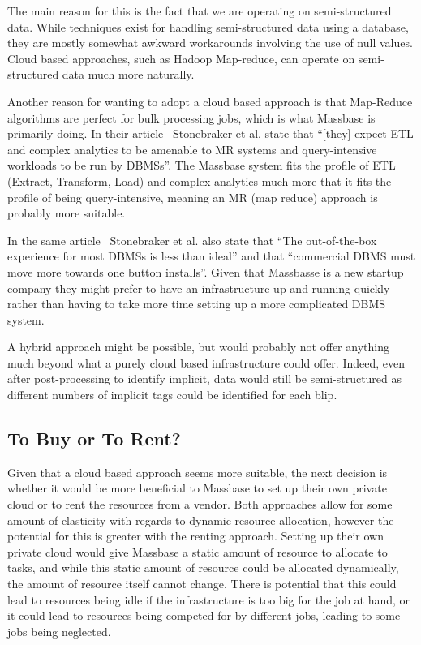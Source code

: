 \documentclass[12pt,a4paper]{article}
\begin{document}
The main reason for this is the fact that we are operating on semi-structured data. While techniques exist for handling semi-structured data using a database, they are mostly somewhat awkward workarounds involving the use of null values. Cloud based approaches, such as Hadoop Map-reduce, can operate on semi-structured data much more naturally.

Another reason for wanting to adopt a cloud based approach is that Map-Reduce algorithms are perfect for bulk processing jobs, which is what Massbase is primarily doing. In their article~\cite{sb} Stonebraker et al. state that ``[they] expect ETL and complex analytics to be amenable to MR systems and query-intensive workloads to be run by DBMSs''. The Massbase system fits the profile of ETL (Extract, Transform, Load) and complex analytics much more that it fits the profile of being query-intensive, meaning an MR (map reduce) approach is probably more suitable.

In the same article~\cite{sb} Stonebraker et al. also state that ``The out-of-the-box experience for most DBMSs is less than ideal'' and that ``commercial DBMS must move more towards one button installs''. Given that Massbasse is a new startup company they might prefer to have an infrastructure up and running quickly rather than having to take more time setting up a more complicated DBMS system.

A hybrid approach might be possible, but would probably not offer anything much beyond what a purely cloud based infrastructure could offer. Indeed, even after post-processing to identify implicit, data would still be semi-structured as different numbers of implicit tags could be identified for each blip.

\subsection{To Buy or To Rent?}
Given that a cloud based approach seems more suitable, the next decision is whether it would be more beneficial to Massbase to set up their own private cloud or to rent the resources from a vendor. Both approaches allow for some amount of elasticity with regards to dynamic resource allocation, however the potential for this is greater with the renting approach. Setting up their own private cloud would give Massbase a static amount of resource to allocate to tasks, and while this static amount of resource could be allocated dynamically, the amount of resource itself cannot change. There is potential that this could lead to resources being idle if the infrastructure is too big for the job at hand, or it could lead to resources being competed for by different jobs, leading to some jobs being neglected.
\end{document}
